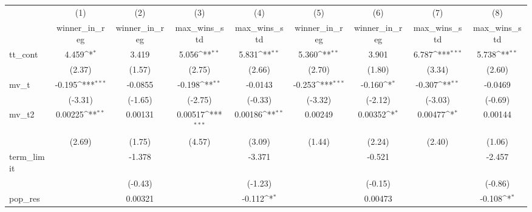 {
\def\sym#1{\ifmmode^{#1}\else\(^{#1}\)\fi}
\begin{tabular}{l*{8}{c}}
\hline\hline
            &\multicolumn{1}{c}{(1)}&\multicolumn{1}{c}{(2)}&\multicolumn{1}{c}{(3)}&\multicolumn{1}{c}{(4)}&\multicolumn{1}{c}{(5)}&\multicolumn{1}{c}{(6)}&\multicolumn{1}{c}{(7)}&\multicolumn{1}{c}{(8)}\\
            &\multicolumn{1}{c}{winner\_in\_reg}&\multicolumn{1}{c}{winner\_in\_reg}&\multicolumn{1}{c}{max\_wins\_std}&\multicolumn{1}{c}{max\_wins\_std}&\multicolumn{1}{c}{winner\_in\_reg}&\multicolumn{1}{c}{winner\_in\_reg}&\multicolumn{1}{c}{max\_wins\_std}&\multicolumn{1}{c}{max\_wins\_std}\\
\hline
tt\_cont     &       4.459\sym{*}  &       3.419         &       5.056\sym{**} &       5.831\sym{**} &       5.360\sym{**} &       3.901         &       6.787\sym{***}&       5.738\sym{**} \\
            &      (2.37)         &      (1.57)         &      (2.75)         &      (2.66)         &      (2.70)         &      (1.80)         &      (3.34)         &      (2.60)         \\
[1em]
mv\_t        &      -0.195\sym{***}&     -0.0855         &      -0.198\sym{**} &     -0.0143         &      -0.253\sym{***}&      -0.160\sym{*}  &      -0.307\sym{**} &     -0.0469         \\
            &     (-3.31)         &     (-1.65)         &     (-2.75)         &     (-0.33)         &     (-3.32)         &     (-2.12)         &     (-3.03)         &     (-0.69)         \\
[1em]
mv\_t2       &     0.00225\sym{**} &     0.00131         &     0.00517\sym{***}&     0.00186\sym{**} &     0.00249         &     0.00352\sym{*}  &     0.00477\sym{*}  &     0.00144         \\
            &      (2.69)         &      (1.75)         &      (4.57)         &      (3.09)         &      (1.44)         &      (2.24)         &      (2.40)         &      (1.06)         \\
[1em]
term\_limit  &                     &      -1.378         &                     &      -3.371         &                     &      -0.521         &                     &      -2.457         \\
            &                     &     (-0.43)         &                     &     (-1.23)         &                     &     (-0.15)         &                     &     (-0.86)         \\
[1em]
pop\_res     &                     &     0.00321         &                     &      -0.112\sym{*}  &                     &     0.00473         &                     &      -0.108\sym{*}  \\

\end{tabular}}
